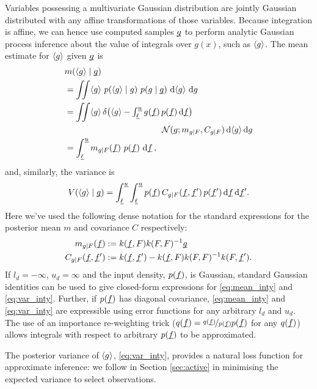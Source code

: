 \documentclass[twoside]{article}
\begin{document}
Variables possessing a multivariate Gaussian distribution are jointly Gaussian distributed with any affine transformations of those variables. Because integration is affine, we can hence use computed samples $\underline{\smash{g}}$ to perform analytic Gaussian process inference about the value of integrals over $g(x)$, such as $\langle g \rangle$. The mean estimate for $\langle g \rangle$ given $\underline{\smash{g}}$ is
%
\begin{align} 
&
\mean{\inty{g}}{\v{g}} 
\nonumber\\
& =\iint \inty{g}~\p{\inty{g}}{g}~\p{g}{\v{g}}~\ud \inty{g}~\ud g                                                                                                                                                               \nonumber\\
&
 =\iint \inty{g}\,\delta\bigl(\inty{g} - {\textstyle\int_{\vl}^{\vu} g(\vx)\,p(\vx)\,\ud \vx}\bigr)
\nonumber\\
& \hspace{4cm}
\N{g}{m_{g|F}}{C_{g|F}}\,\ud \inty{g} \,\ud g 
\nonumber\\
&
 = \int_{\vl}^{\vu} m_{g|F}(\vx)~p(\vx)~\ud \vx
\,, \label{eq:mean_inty}
\end{align}
and, similarly, the variance is
\begin{align} 
V(\langle g \rangle\mid\underline{\smash{g}})
=\int_{\underline{\smash{\ell}}}^{\underline{\smash{u}}}\int_{\underline{\smash{\ell}}}^{\underline{\smash{u}}} p(\underline{\smash{f}})\,C_{g|F}(\underline{\smash{f}}, \underline{\smash{f}}')\,p(\underline{\smash{f}}')\,\mathrm{d} \underline{\smash{f}}\,\mathrm{d} \underline{\smash{f}}'
. \label{eq:var_inty}
\end{align}
Here we've used the following dense notation for the standard \gp expressions for the posterior mean $m$ and covariance $C$ respectively:
\begin{align}
m_{g|F}(\underline{\smash{f}})& := k(\underline{\smash{f}}, F) k(F, F)^{-1} \underline{\smash{g}}\\
C_{g|F}(\underline{\smash{f}}, \underline{\smash{f}}')& := k(\underline{\smash{f}}, \underline{\smash{f}}') - k(\underline{\smash{f}}, F) k(F, F)^{-1} k(F, \underline{\smash{f}}').
\end{align}
If $l_d=-\infty$, $u_d=\infty$ and the input density, $p(\underline{\smash{f}})$, is Gaussian, standard Gaussian identities \citep{BZMonteCarlo} can be used to give closed-form expressions for \eqref{eq:mean_inty} and \eqref{eq:var_inty}. Further, if $p(\underline{\smash{f}})$ has diagonal covariance, \eqref{eq:mean_inty} and \eqref{eq:var_inty} are expressible using error functions for any arbitrary $l_d$ and $u_d$.
The use of an importance re-weighting trick ($q(\underline{\smash{f}}) = \nicefrac{q(\underline{\smash{f}})}{p(\underline{\smash{f}})} p(\underline{\smash{f}})$ for any $q(\underline{\smash{f}})$) allows integrals with respect to arbitrary $p(\underline{\smash{f}})$ to be approximated. 

The posterior variance of $\langle g \rangle$, \eqref{eq:var_inty}, provides a natural loss function for approximate inference: we follow \citet{osborne2012active} in Section \ref{sec:active} in minimising the expected variance to select observations. 
\end{document}
